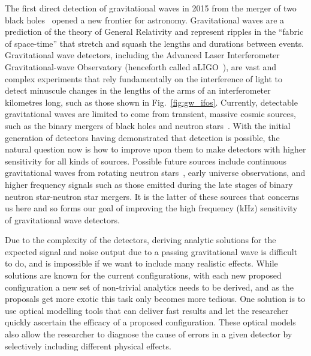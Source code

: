 \documentclass[aps,pra,superscriptaddress,reprint,nofootinbib]{revtex4-1}
\begin{document}
The first direct detection of gravitational waves in 2015 from the merger of two black holes~\cite{GW150914} opened a new frontier for astronomy. 
Gravitational waves are a prediction of the theory of General Relativity and represent ripples in the ``fabric of space-time'' that stretch and squash the lengths and durations between events. Gravitational wave detectors, including the Advanced Laser Interferometer Gravitational-wave Observatory (henceforth called aLIGO~\cite{AdvancedLIGO:2015}), are vast and complex experiments that rely fundamentally on the interference of light to detect minuscule changes in the lengths of the arms of an interferometer kilometres long, such as those shown in Fig.~\ref{fig:gw_ifos}. Currently, detectable gravitational waves are limited to come from transient, massive cosmic sources, such as the binary mergers of black holes and neutron stars~\cite{GWTC-1:2018}. With the initial generation of detectors having demonstrated that detection is possible, the natural question now is how to improve upon them to make detectors with higher sensitivity for all kinds of sources.
Possible future sources include continuous gravitational waves from rotating neutron stars~\cite{SuvorovaEtAl:2016}, early universe observations, and higher frequency signals such as those emitted during the late stages of binary neutron star-neutron star mergers.
It is the latter of these sources that concerns us here and so forms our goal of improving the high frequency (kHz) sensitivity of gravitational wave detectors.


Due to the complexity of the detectors, deriving analytic solutions for the expected signal and noise output due to a passing gravitational wave is difficult to do, and is impossible if we want to include many realistic effects. %
While solutions are known for the current configurations, with each new proposed configuration a new set of non-trivial analytics needs to be derived, and as the proposals get more exotic this task only becomes more tedious.
One solution is to use optical modelling tools that can deliver fast results and let the researcher quickly ascertain the efficacy of a proposed configuration. These optical models also allow the researcher to diagnose the cause of errors in a given detector by selectively including different physical effects.
\end{document}
